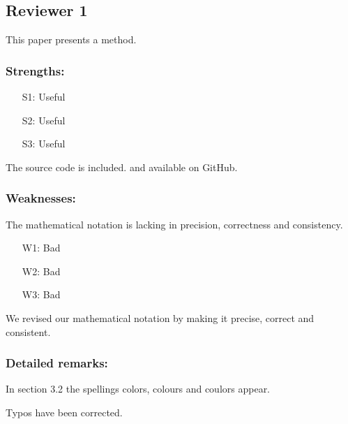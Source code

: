 \subsection{Reviewer 1} \label{sec:rev:1}

This paper presents a method.

\subsubsection*{Strengths:}

\begin{itemize}[itemsep=1pt,parsep=1pt]
    \item[S1:] Useful
    \item[S2:] Useful
    \item[S3:] Useful
\end{itemize}

\noindent The source code is included. and available on GitHub.


\subsubsection*{Weaknesses:}

The mathematical notation is lacking in precision, correctness and consistency.

\begin{itemize}[itemsep=1pt,parsep=1pt]
    \item[W1:] Bad
    \item[W2:] Bad
    \item[W3:] Bad
\end{itemize}

\begin{response} \label{res:rev1:weak:math}
We revised our mathematical notation by making it precise, correct and consistent.
\end{response}


\subsubsection*{Detailed remarks:}

In section 3.2 the spellings colors, colours and coulors appear.

\begin{response} \label{res:rev1:detail:types}
Typos have been corrected.
\end{response}


